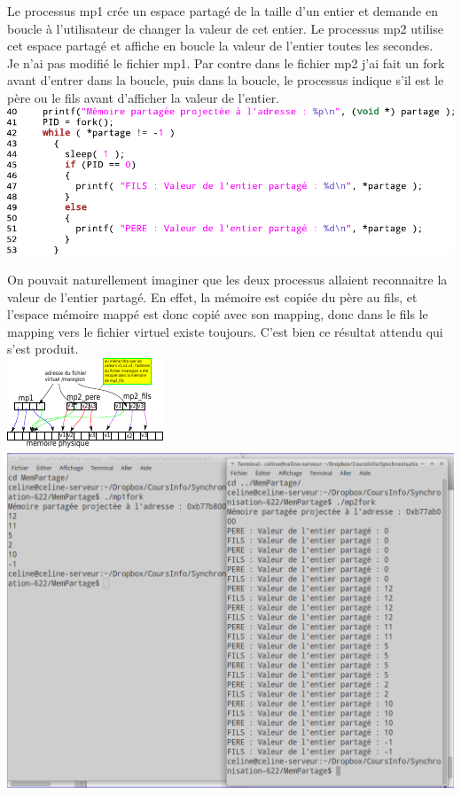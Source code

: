   Le processus mp1 crée un espace partagé de la taille d'un entier et demande en boucle à l'utilisateur de changer la valeur de cet entier. Le processus mp2 utilise cet espace partagé et affiche en boucle la valeur de l'entier toutes les secondes. \\

 Je n'ai pas modifié le fichier mp1. Par contre dans le fichier mp2 j'ai fait un fork avant d'entrer dans la boucle, puis dans la boucle, le processus indique s'il est le père ou le fils avant d'afficher la valeur de l'entier.\\

\includegraphics[width=\linewidth]{fig21.pdf}

 On pouvait naturellement imaginer que les deux processus allaient reconnaitre la valeur de l'entier partagé. En effet, la mémoire est copiée du père au fils, et l'espace mémoire mappé est donc copié avec son mapping, donc dans le fils le mapping vers le fichier virtuel existe toujours. C'est bien ce résultat attendu qui s'est produit. \\

\includegraphics[width=\linewidth]{fig20.pdf}\\

\includegraphics[width=\linewidth]{fig22.pdf}
